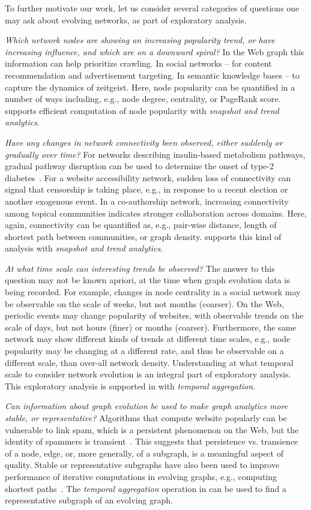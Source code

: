 To further motivate our work, let us consider several categories of
questions one may ask about evolving networks, as part of exploratory
analysis.

{\em Which network nodes are showing an increasing popularity trend,
  or have increasing influence, and which are on a downward spiral?}
In the Web graph this information can help prioritize crawling.  In
social networks -- for content recommendation and advertisement
targeting.  In semantic knowledge bases -- to capture the dynamics of
zeitgeist.  Here, node popularity can be quantified in a number of
ways including, e.g., node degree, centrality, or PageRank score.  \ql
supports efficient computation of node popularity with {\em snapshot
  and trend analytics}.

{\em Have any changes in network connectivity been observed, either
  suddenly or gradually over time?}  For networks describing
insulin-based metabolism pathways, gradual pathway disruption can be
used to determine the onset of type-2
diabetes~\cite{DBLP:journals/tcsb/BeyerTLSF10}.  For a website
accessibility network, sudden loss of connectivity can signal that
censorship is taking place, e.g., in response to a recent election or
another exogenous event.  In a co-authorship network, increasing
connectivity among topical communities indicates stronger
collaboration across domains.  Here, again, connectivity can be
quantified as, e.g., pair-wise distance, length of shortest path
between communities, or graph density.  \ql supports this kind of
analysis with {\em snapshot and trend analytics}.

{\em At what time scale can interesting trends be observed?} The
answer to this question may not be known apriori, at the time when
graph evolution data is being recorded.  For example, changes in node
centrality in a social network may be observable on the scale of
weeks, but not months (coarser).  On the Web, periodic events may
change popularity of websites, with observable trends on the scale of
days, but not hours (finer) or months (coarser).  Furthermore, the
same network may show different kinds of trends at different time
scales, e.g., node popularity may be changing at a different rate, and
thus be observable on a different scale, than over-all network
density.  Understanding at what temporal scale to consider network
evolution is an integral part of exploratory analysis.  This
exploratory analysis is supported in \ql with {\em temporal
  aggregation}.

{\em Can information about graph evolution be used to make graph
  analytics more stable, or representative?}  Algorithms that compute
website popularly can be vulnerable to link spam, which is a
persistent phenomenon on the Web, but the identity of spammers is
transient~\cite{DBLP:conf/cikm/YangQZGL07}.  This suggests that
persistence vs. transience of a node, edge, or, more generally, of a
subgraph, is a meaningful aspect of quality.  Stable or representative
subgraphs have also been used to improve performance of iterative
computations in evolving graphs, e.g., computing shortest
paths~\cite{Ren2011}.  The {\em temporal aggregation} operation in
\ql {}can be used to find a
representative subgraph of an evolving graph.


